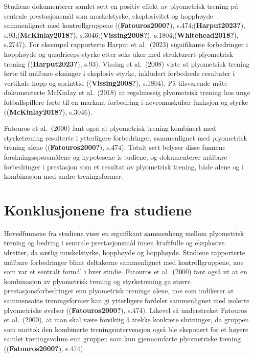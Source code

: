\documentclass[
  letterpaper,
  DIV=11,
  numbers=noendperiod]{scrreprt}
\begin{document}
Studiene dokumenterer samlet sett en positiv effekt av plyometrisk
trening på sentrale prestasjonsmål som muskelstyrke, eksplosivitet og
hopphøyde sammenlignet med kontrollgruppene ((\textbf{Fatouros2000?}),
s.474;(\textbf{Harput2023?}), s.93;(\textbf{McKinlay2018?}),
s.3046;(\textbf{Vissing2008?}), s.1804;(\textbf{Whitehead2018?}),
s.2747). For eksempel rapporterte Harput et al.~(2023) signifikante
forbedringer i hopphøyde og quadriceps-styrke etter seks uker med
strukturert plyometrisk trening ((\textbf{Harput2023?}), s.93). Vissing
et al.~(2008) viste at plyometrisk trening førte til målbare økninger i
eksplosiv styrke, inkludert forbedrede resultater i vertikale hopp og
sprinttid ((\textbf{Vissing2008?}), s.1804). På tilsvarende måte
dokumenterte McKinlay et al.~(2018) at regelmessig plyometrisk trening
hos unge fotballspillere førte til en markant forbedring i nevromuskulær
funksjon og styrke ((\textbf{McKinlay2018?}), s.3046).

Fatouros et al.~(2000) fant også at plyometrisk trening kombinert med
styrketrening resulterte i ytterligere forbedringer, sammenlignet med
plyometrisk trening alene ((\textbf{Fatouros2000?}), s.474). Totalt sett
belyser disse funnene forskningsspørsmålene og hypotesene is tudiene, og
dokumenterer målbare forbedringer i prestasjon som et resultat av
plyometrisk trening, både alene og i kombinasjon med andre
treningsformer.

\section{Konklusjonene fra studiene}\label{konklusjonene-fra-studiene}

Hovedfunnene fra studiene viser en signifikant sammenheng mellom
plyometrisk trening og bedring i sentrale prestasjonsmål innen
kraftfulle og eksplosive idretter, da særlig muskelstyrke, hopphøyde og
hopphøyde. Studiene rapporterte målbare forbedringer blant deltakerne
sammenlignet med kontrollgruppene, noe som var et sentralt formål i hver
studie. Fatouros et al.~(2000) fant også ut at en kombinasjon av
plyometrisk trening og styrketrening ga større prestasjonsforbedringer
enn plyometrisk treninge alene, noe som indikerer at sammensatte
treningsformer kan gi ytterligere fordeler sammenlignet med isolerte
plyometriske øvelser ((\textbf{Fatouros2000?}), s.474). Likevel så
understreket Fatouros et al.~(2000), at man skal være forsiktig å trekke
konkrete slutninger, da gruppen som mottok den kombinerte
treningsintervensjon også ble eksponert for et høyere samlet
treningsvolum enn gruppen som kun gjennomførte plyometriske trening
((\textbf{Fatouros2000?}), s.474).
\end{document}
